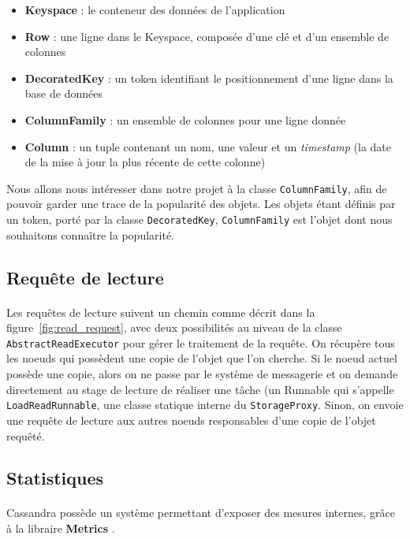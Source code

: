 \documentclass[12pt]{article}
\newcommand{\class}[1]{\texttt{#1}}
\begin{document}
\begin{itemize}
	\item \textbf{Keyspace} : le conteneur des données de l'application
	\item \textbf{Row} : une ligne dans le Keyspace, composée d'une clé et d'un ensemble de colonnes
	\item \textbf{DecoratedKey} : un token identifiant le positionnement d'une ligne dans la base de données
	\item \textbf{ColumnFamily} : un ensemble de colonnes pour une ligne donnée
	\item \textbf{Column} : un tuple contenant un nom, une valeur et un \textit{timestamp} (la date de la mise à jour la plus récente de cette colonne)
\end{itemize}

Nous allons nous intéresser dans notre projet à la classe \class{ColumnFamily}, afin de pouvoir garder une trace de la popularité des objets. Les objets étant définis par un token, porté par la classe \class{DecoratedKey}, \class{ColumnFamily} est l'objet dont nous souhaitons connaître la popularité.

\subsection{Requête de lecture}

\paragraph{}Les requêtes de lecture suivent un chemin comme décrit dans la figure~\ref{fig:read_request}, avec deux possibilités au niveau de la classe \class{AbstractReadExecutor} pour gérer le traitement de la requête. On récupère tous les noeuds qui possèdent une copie de l'objet que l'on cherche. Si le noeud actuel possède une copie, alors on ne passe par le système de messagerie et on demande directement au stage de lecture de réaliser une tâche (un Runnable qui s'appelle \class{LoadReadRunnable}, une classe statique interne du \class{StorageProxy}. Sinon, on envoie une requête de lecture aux autres noeuds responsables d'une copie de l'objet requêté.

\subsection{Statistiques}

\paragraph{} Cassandra possède un système permettant d'exposer des mesures internes, grâce à la libraire \textbf{Metrics} \cite{Metrics2010}.
\end{document}
